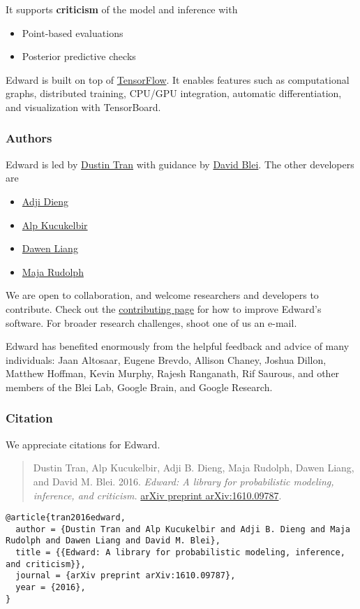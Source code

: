 It supports \textbf{criticism} of the model and inference with

\begin{itemize}
\item Point-based evaluations
\item Posterior predictive checks
\end{itemize}

Edward is built on top of
\href{https://www.tensorflow.org}{TensorFlow}. It enables features such
as computational graphs, distributed training, CPU/GPU integration,
automatic differentiation, and visualization with TensorBoard.

\subsubsection{Authors}

Edward is led by \href{http://dustintran.com}{Dustin Tran} with guidance
by \href{http://www.cs.columbia.edu/~blei/}{David Blei}. The other developers
are
\begin{itemize}
  \item \href{http://stat.columbia.edu/~diengadji/}{Adji Dieng}
  \item \href{http://www.proditus.com/}{Alp Kucukelbir}
  \item \href{http://www.ee.columbia.edu/~dliang/}{Dawen Liang}
  \item \href{http://maja-rita-rudolph.com/}{Maja Rudolph}
\end{itemize}
We are open to collaboration, and welcome
researchers and developers to contribute. Check out the
\href{/contributing}{contributing page} for how to improve Edward's software.
For broader research challenges, shoot one of us an e-mail.

Edward has benefited enormously from the helpful feedback and advice
of many individuals: Jaan Altosaar, Eugene Brevdo, Allison Chaney,
Joshua Dillon, Matthew Hoffman, Kevin Murphy, Rajesh Ranganath, Rif
Saurous, and other members of the Blei Lab, Google Brain, and Google
Research.

\subsubsection{Citation}

We appreciate citations for Edward.

\begin{quote}
Dustin Tran, Alp Kucukelbir, Adji B. Dieng, Maja Rudolph, Dawen Liang,
and David M. Blei.
2016.
\emph{Edward: A library for probabilistic modeling, inference, and criticism.}
\href{https://arxiv.org/abs/1610.09787}{arXiv preprint arXiv:1610.09787}.
\end{quote}

\begin{lstlisting}[class=JSON]
@article{tran2016edward,
  author = {Dustin Tran and Alp Kucukelbir and Adji B. Dieng and Maja Rudolph and Dawen Liang and David M. Blei},
  title = {{Edward: A library for probabilistic modeling, inference, and criticism}},
  journal = {arXiv preprint arXiv:1610.09787},
  year = {2016},
}
\end{lstlisting}
